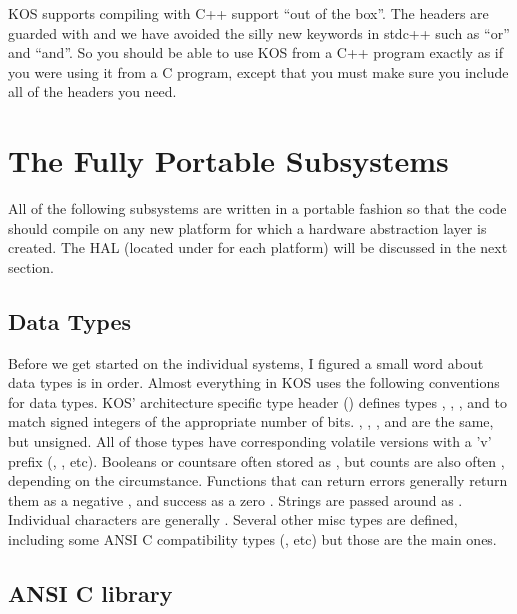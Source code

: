 \documentclass[english]{report}
\begin{document}
KOS supports compiling with C++ support {}``out of the box''. The
headers are guarded with  and we have avoided
the silly new keywords in stdc++ such as ``or'' and ``and''.
So you should be able to use KOS from a C++ program exactly as if
you were using it from a C program, except that you must make sure
you include all of the headers you need.



\chapter{The Fully Portable Subsystems}

All of the following subsystems are written in a portable fashion
so that the code should compile on any new platform for which a hardware
abstraction layer is created. The HAL (located under  for
each platform) will be discussed in the next section.


\section{Data Types}

Before we get started on the individual systems, I figured a small
word about data types is in order. Almost everything in KOS uses the
following conventions for data types. KOS' architecture specific type
header () defines types , ,
, and  to match signed integers of the appropriate
number of bits. , , , and
 are the same, but unsigned. All of those types have
corresponding volatile versions with a 'v' prefix (,
, etc). Booleans or countsare often stored as , but counts
are also often , depending on the circumstance. Functions
that can return errors generally return them as a negative , and
success as a zero . Strings are passed around as .
Individual characters are generally . Several other
misc types are defined, including some ANSI C compatibility types
(, etc) but those are the main ones.


\section{ANSI C library}
\end{document}
